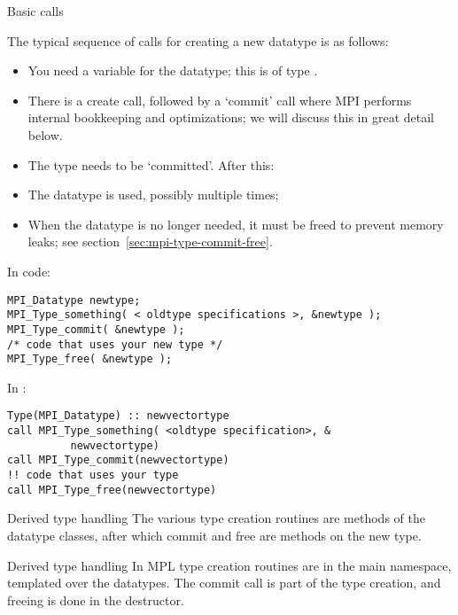  {Basic calls}
\label{sec:data-commit}

The typical sequence of calls for creating a new datatype is as follows:
\begin{itemize}
\item You need a variable for the datatype;
  this is of type .
\item There is a create call, followed by a `commit' call where MPI
  performs internal bookkeeping and optimizations;
  we will discuss this in great detail below.
\item The type needs to be `committed'. After this:
\item The datatype is used, possibly multiple times;
\item When the datatype is no longer needed, it must be freed to prevent memory leaks;
  see section~\ref{sec:mpi-type-commit-free}.
\end{itemize}
In code:
\begin{lstlisting}
MPI_Datatype newtype;
MPI_Type_something( < oldtype specifications >, &newtype );
MPI_Type_commit( &newtype );
/* code that uses your new type */
MPI_Type_free( &newtype );
\end{lstlisting}

In :
\lstset{language=Fortran}
\begin{lstlisting}
Type(MPI_Datatype) :: newvectortype
call MPI_Type_something( <oldtype specification>, &
          newvectortype)
call MPI_Type_commit(newvectortype)
!! code that uses your type
call MPI_Type_free(newvectortype)
\end{lstlisting}
\lstset{language=C}

\begin{pythonnote}{Derived type handling}
  The various type creation routines are methods
  of the datatype classes, after which commit and free are
  methods on the new type.
\end{pythonnote}

\begin{mplnote}{Derived type handling}
  \label{mpl:derived}
  In \ac{MPL} type creation routines are in the main namespace,
  templated over the datatypes.
  The commit call is part of the type creation,
  and freeing is done in the destructor.
\end{mplnote}

